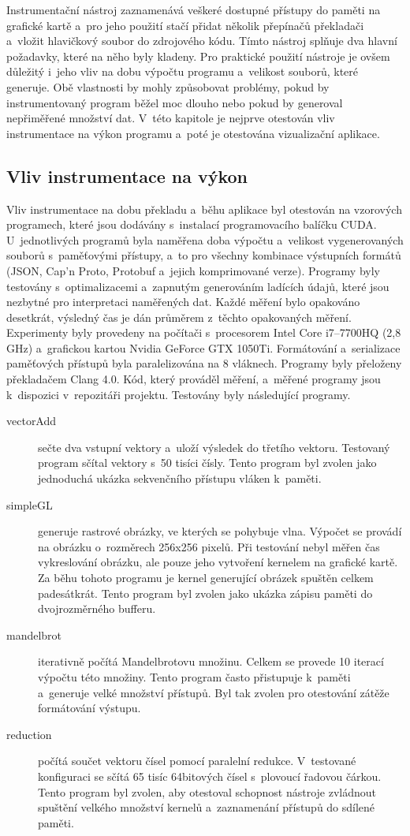 Instrumentační nástroj zaznamenává veškeré dostupné přístupy do paměti na grafické kartě a~pro jeho použití stačí přidat několik přepínačů překladači a~vložit hlavičkový soubor do zdrojového kódu. Tímto nástroj splňuje dva hlavní požadavky, které na něho byly kladeny. Pro praktické použití nástroje je ovšem důležitý i~jeho vliv na dobu výpočtu programu a~velikost souborů, které generuje. Obě vlastnosti by mohly způsobovat problémy, pokud by instrumentovaný program běžel moc dlouho nebo pokud by generoval nepřiměřené množství dat. V~této kapitole je nejprve otestován vliv instrumentace na výkon programu a~poté je otestována vizualizační aplikace.

\subsection{Vliv instrumentace na výkon}
Vliv instrumentace na dobu překladu a~běhu aplikace byl otestován na vzorových programech, které jsou dodávány s~instalací programovacího balíčku CUDA. U~jednotlivých programů byla naměřena doba výpočtu a~velikost vygenerovaných souborů s~paměťovými přístupy, a~to pro všechny kombinace výstupních formátů (JSON, Cap'n Proto, Protobuf a~jejich komprimované verze). Programy byly testovány s~optimalizacemi a~zapnutým generováním ladících údajů, které jsou nezbytné pro interpretaci naměřených dat. Každé měření bylo opakováno desetkrát, výsledný čas je dán průměrem z~těchto opakovaných měření. Experimenty byly provedeny na počítači s~procesorem Intel Core i7–7700HQ (2,8 GHz) a~grafickou kartou Nvidia GeForce GTX 1050Ti. Formátování a~serializace paměťových přístupů byla paralelizována na 8 vláknech. Programy byly přeloženy překladačem Clang 4.0. Kód, který prováděl měření, a~měřené programy jsou k~dispozici v~repozitáři projektu. Testovány byly následující programy.
\begin{description}
	\item[vectorAdd] sečte dva vstupní vektory a~uloží výsledek do třetího vektoru. Testovaný program sčítal vektory s~50 tisíci čísly. Tento program byl zvolen jako jednoduchá ukázka sekvenčního přístupu vláken k~paměti.
	\item[simpleGL] generuje rastrové obrázky, ve kterých se pohybuje vlna. Výpočet se provádí na obrázku o~rozměrech 256x256 pixelů. Při testování nebyl měřen čas vykreslování obrázku, ale pouze jeho vytvoření kernelem na grafické kartě. Za běhu tohoto programu je \mbox{kernel} generující obrázek spuštěn celkem padesátkrát. Tento program byl zvolen jako ukázka zápisu paměti do dvojrozměrného bufferu.
	\item[mandelbrot] iterativně počítá Mandelbrotovu množinu. Celkem se provede 10 iterací výpočtu této množiny. Tento program často přistupuje k~paměti a~generuje velké množství přístupů. Byl tak zvolen pro otestování zátěže formátování výstupu.
	\item[reduction] počítá součet vektoru čísel pomocí paralelní redukce. V~testované konfiguraci se sčítá 65 tisíc 64bitových čísel s~plovoucí řadovou čárkou. Tento program byl zvolen, aby otestoval schopnost nástroje zvládnout spuštění velkého množství kernelů a~zaznamenání přístupů do sdílené paměti.
\end{description}

